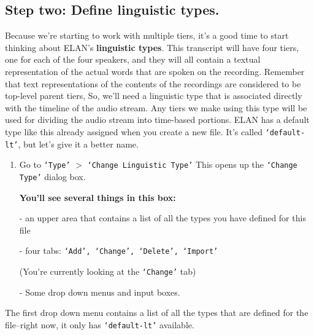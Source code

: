 \documentclass[letterpaper,12pt]{article}
\begin{document}
\subsection*{Step two: Define linguistic types.}
Because we're starting to work with multiple tiers, it's a good time to start thinking about ELAN's \textbf{linguistic types}. This transcript will have four tiers, one for each of the four speakers, and they will all contain a textual representation of the actual words that are spoken on the recording. Remember that text representations of the contents of the recordings are considered to be top-level parent tiers, So, we'll need a linguistic type that is associated directly with the timeline of the audio stream. Any tiers we make using this type will be used for dividing the audio stream into time-based portions. ELAN has a default type like this already assigned when you create a new file. It's called \texttt{`default-lt'}, but let's give it a better name.

\begin{enumerate}
\item Go to \texttt{`Type'} $>$ \texttt{`Change Linguistic Type'}
This opens up the \texttt{`Change Type'} dialog box. 
\end{enumerate}
\begin{itemize}
\item[] \textbf{You'll see several things in this box:}
\item[-] an upper area that contains a list of all the types you have defined for this file
\item[-] four tabs: \texttt{`Add', `Change', `Delete', `Import'} 
\item[] (You're currently looking at the \texttt{`Change'} tab)
\item[-] Some drop down menus and input boxes.
\end{itemize}

\noindent The first drop down menu contains a list of all the types that are defined for the file--right now, it only has \texttt{`default-lt'} available.\\
\end{document}
